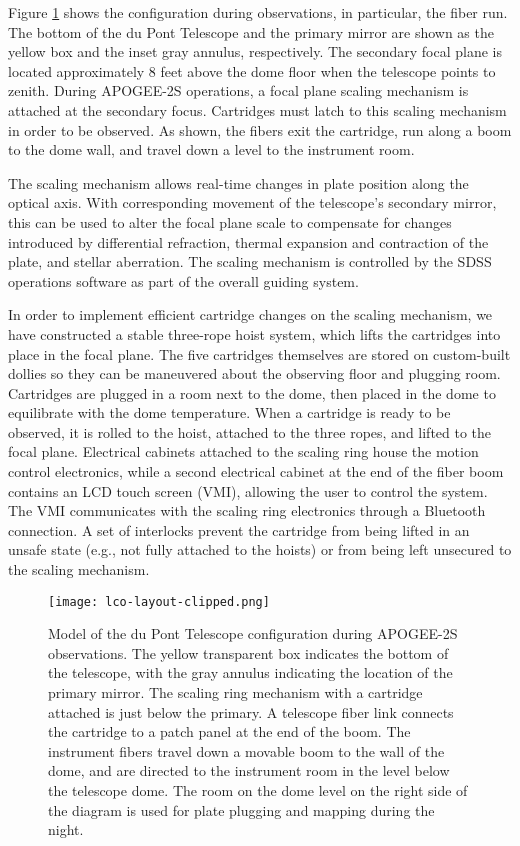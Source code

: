 Figure \ref{fig:lco-layout} shows the configuration during
observations, in particular, the fiber run. The bottom of the du Pont
Telescope and the primary mirror are shown as the yellow box and the
inset gray annulus, respectively. The secondary focal plane is located
approximately 8 feet above the dome floor when the telescope points to
zenith. During APOGEE-2S operations, a focal plane scaling mechanism
is attached at the secondary focus. Cartridges must latch to this
scaling mechanism in order to be observed. As shown, the fibers exit
the cartridge, run along a boom to the dome wall, and travel down a
level to the instrument room.

The scaling mechanism allows real-time changes in plate position along
the optical axis. With corresponding movement of the telescope's
secondary mirror, this can be used to alter the focal plane scale to
compensate for changes introduced by differential refraction, thermal
expansion and contraction of the plate, and stellar aberration. The
scaling mechanism is controlled by the SDSS operations software as
part of the overall guiding system.

In order to implement efficient cartridge changes on the scaling
mechanism, we have constructed a stable three-rope hoist system, which
lifts the cartridges into place in the focal plane. The five
cartridges themselves are stored on custom-built dollies so they can
be maneuvered about the observing floor and plugging room.  Cartridges
are plugged in a room next to the dome, then placed in the dome to
equilibrate with the dome temperature. When a cartridge is ready to be
observed, it is rolled to the hoist, attached to the three ropes, and
lifted to the focal plane. Electrical cabinets attached to the scaling
ring house the motion control electronics, while a second electrical
cabinet at the end of the fiber boom contains an LCD touch screen
(VMI), allowing the user to control the system.  The VMI communicates
with the scaling ring electronics through a Bluetooth connection.  A set
of interlocks prevent the cartridge from being lifted in an unsafe
state (e.g., not fully attached to the hoists) or from being left
unsecured to the scaling mechanism.

\begin{figure}[!t]
\centering
\texttt{[image: lco-layout-clipped.png]}
\caption{ \label{fig:lco-layout} Model of the du Pont Telescope
configuration during APOGEE-2S observations. The yellow transparent
box indicates the bottom of the telescope, with the gray annulus
indicating the location of the primary mirror. The scaling ring
mechanism with a cartridge attached is just below the primary. A
telescope fiber link connects the cartridge to a patch panel at the end
of the boom. The instrument fibers travel down a movable boom to the
wall of the dome, and are directed to the instrument room in the level
below the telescope dome. The room on the dome level on the right side
of the diagram is used for plate plugging and mapping during the
night.}
\end{figure}


